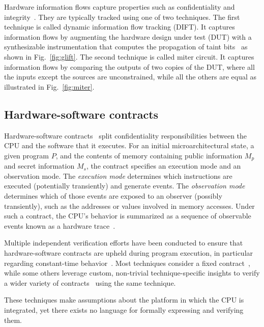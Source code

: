 Hardware information flows capture properties such as confidentiality and integrity~\cite{hu2021hardware}.
They are typically tracked using one of two techniques.
The first technique is called dynamic information flow tracking (DIFT).
It captures information flows by augmenting the hardware design under test (DUT) with a synthesizable instrumentation that computes the propagation of taint bits~\cite{tiwari2009complete,ardeshiricham2017register,solt2022cellift,solt2024hybridift,ceesay2024mucfi} as shown in Fig.~\ref{fig:glift}.
The second technique is called miter circuit.
It captures information flows by comparing the outputs of two copies of the DUT, where all the inputs except the sources are unconstrained, while all the others are equal as illustrated in Fig.~\ref{fig:miter}.

\subsection{Hardware-software contracts}
\label{subsec:hw-sw-contracts}

Hardware-software contracts~\cite{guarnieri2021hardware} split confidentiality responsibilities between the CPU and the software that it executes.
For an initial microarchitectural state, a given program $P$, and the contents of memory containing public information $M_p$ and secret information $M_s$, the contract specifies an execution mode and an observation mode.
The \emph{execution mode} determines which instructions are executed (potentially transiently) and generate events.
The \emph{observation mode} determines which of those events are exposed to an observer (possibly transiently), such as the addresses or values involved in memory accesses.
Under such a contract, the CPU's behavior is summarized as a sequence of observable events known as a hardware trace~\cite{guarnieri2021hardware,oleksenko2022revizor}.

Multiple independent verification efforts have been conducted to ensure that hardware-software contracts are upheld during program execution, in particular regarding constant-time behavior~\cite{dinesh2024conjunct,ceesay2024mucfi,guarnieri2021hardware,tan2025contractshadowlogic,dinesh2025h,hsiao2024rtl2mmupath,wang2023specification}.
Most techniques consider a fixed contract~\cite{dinesh2024conjunct,ceesay2024mucfi,tan2025contractshadowlogic,dinesh2025h}, while some others leverage custom, non-trivial technique-specific insights to verify a wider variety of contracts~\cite{hsiao2024rtl2mmupath,wang2023specification} using the same technique.

These techniques make assumptions about the platform in which the CPU is integrated, yet there exists no language for formally expressing and verifying them.
